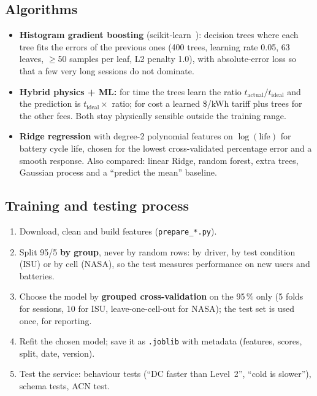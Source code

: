\documentclass[11pt,a4paper]{article}
\begin{document}
\subsection{Algorithms}
\begin{itemize}
  \item \textbf{Histogram gradient boosting} (scikit-learn~\cite{skl}): decision trees where each tree fits the errors
        of the previous ones (400 trees, learning rate 0.05, 63 leaves, $\geq$50 samples per leaf, L2 penalty 1.0),
        with absolute-error loss so that a few very long sessions do not dominate.
  \item \textbf{Hybrid physics + ML:} for time the trees learn the ratio $t_\mathrm{actual}/t_\mathrm{ideal}$ and the
        prediction is $t_\mathrm{ideal}\times$ ratio; for cost a learned \$/kWh tariff plus trees for the other fees.
        Both stay physically sensible outside the training range.
  \item \textbf{Ridge regression} with degree-2 polynomial features on $\log(\text{life})$ for battery cycle life,
        chosen for the lowest cross-validated percentage error and a smooth response. Also compared: linear Ridge,
        random forest, extra trees, Gaussian process and a ``predict the mean'' baseline.
\end{itemize}

\subsection{Training and testing process}
\begin{enumerate}
  \item Download, clean and build features (\texttt{prepare\_*.py}).
  \item Split 95/5 \textbf{by group}, never by random rows: by driver, by test condition (ISU) or by cell (NASA), so
        the test measures performance on new users and batteries.
  \item Choose the model by \textbf{grouped cross-validation} on the 95\,\% only (5 folds for sessions, 10 for ISU,
        leave-one-cell-out for NASA); the test set is used once, for reporting.
  \item Refit the chosen model; save it as \texttt{.joblib} with metadata (features, scores, split, date, version).
  \item Test the service: behaviour tests (``DC faster than Level~2'', ``cold is slower''), schema tests, ACN test.
\end{enumerate}
\end{document}
